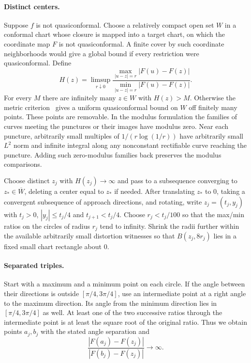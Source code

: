 \documentclass[11pt]{amsart}
\begin{document}
\paragraph{Distinct centers.}
Suppose \(f\) is not quasiconformal. Choose a relatively compact open
set \(W\) in a conformal chart whose closure is mapped into a target
chart, on which the coordinate map \(F\) is not quasiconformal.
A finite cover by such coordinate neighborhoods would give a global
bound if every restriction were quasiconformal. Define
\[
 H(z)=\limsup_{r\downarrow0}
 \frac{\max_{|u-z|=r}|F(u)-F(z)|}{\min_{|u-z|=r}|F(u)-F(z)|}.
\]
For every \(M\) there are infinitely many \(z\in W\) with \(H(z)>M\).
Otherwise the metric criterion~\cite{Vaisala} gives a uniform
quasiconformal bound on \(W\) off finitely many points. These points
are removable. In the modulus formulation the families of curves
meeting the punctures or their images have modulus zero. Near each
puncture, arbitrarily small multiples of \(1/(r\log(1/r))\) have
arbitrarily small \(L^2\) norm and infinite integral along any
nonconstant rectifiable curve reaching the puncture. Adding such
zero-modulus families back preserves the modulus comparisons.

Choose distinct \(z_j\) with \(H(z_j)\to\infty\) and pass to a
subsequence converging to \(z_*\in\overline W\), deleting a center
equal to \(z_*\) if needed. After translating \(z_*\) to \(0\),
taking a convergent subsequence of approach directions, and rotating,
write \(z_j=(t_j,y_j)\) with \(t_j>0\), \(|y_j|\le t_j/4\) and
\(t_{j+1}<t_j/4\). Choose \(r_j<t_j/100\) so that the max/min ratios
on the circles of radius \(r_j\) tend to infinity. Shrink the radii
further within the available arbitrarily small distortion witnesses
so that \(B(z_j,8r_j)\) lies in a fixed small chart rectangle about
\(0\).

\paragraph{Separated triples.}
Start with a maximum and a minimum point on each circle. If the
angle between their directions is outside \([\pi/4,3\pi/4]\), use
an intermediate point at a right angle to the maximum direction.
Its angle from the minimum direction lies in \([\pi/4,3\pi/4]\)
as well. At least one of the two successive ratios through the
intermediate point is at least the square root of the original
ratio. Thus we obtain points \(a_j,b_j\) with the stated angle
separation and
\[
 \frac{|F(a_j)-F(z_j)|}{|F(b_j)-F(z_j)|}\longrightarrow\infty.
\]
\end{document}
